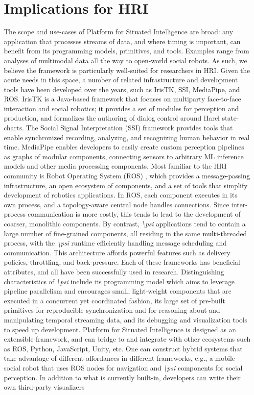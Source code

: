 \documentclass[letterpaper]{article} %
\newcommand{\psif}{\emph{\textbackslash psi} }
\begin{document}
\vspace{-3.02mm}
\section{Implications for HRI}

The scope and use-cases of Platform for Situated Intelligence are broad: any application that processes streams of data, and where timing is important, can benefit from its programming models, primitives, and tools. Examples range from analyses of multimodal data all the way to open-world social robots. As such, we believe the framework is particularly well-suited for researchers in HRI.  Given the acute needs in this space, a number of related infrastructure and development tools have been developed over the years, such as IrisTK, SSI, MediaPipe, and ROS. IrisTK \cite{skantze2012iristk} is a Java-based framework that focuses on multiparty face-to-face interaction and social robotics; it provides a set of modules for perception and production, and formalizes the authoring of dialog control around Harel state-charts. The Social Signal Interpretation (SSI) framework \cite{wagner2013social} provides tools that enable synchronized recording, analyzing, and recognizing human behavior in real time. MediaPipe \cite{lugaresi2019mediapipe} enables developers to easily create custom perception pipelines as graphs of modular components, connecting sensors to arbitrary ML inference models and other media processing components.  Most familiar to the HRI community is Robot Operating System (ROS) \cite{Quigley09}, which provides a message-passing infrastructure, an open ecosystem of components, and a set of tools that simplify development of robotics applications. In ROS, each component executes in its own process, and a topology-aware central node handles connections. Since inter-process communication is more costly, this tends to lead to the development of coarser, monolithic components. By contrast, \psif applications tend to contain a large number of fine-grained components, all residing in the same multi-threaded process, with the \psif runtime efficiently handling message scheduling and communication. This architecture affords powerful features such as delivery policies, throttling, and back-pressure.  Each of these frameworks has beneficial attributes, and all have been successfully used in research. Distinguishing characteristics of \psif include its programming model which aims to leverage pipeline parallelism and encourages small, light-weight components that are executed in a concurrent yet coordinated fashion, its large set of pre-built primitives for reproducible synchronization and for reasoning about and manipulating temporal streaming data, and its debugging and visualization tools to speed up development.  Platform for Situated Intelligence is designed as an extensible framework, and can bridge to and integrate with other ecosystems such as ROS, Python, JavaScript, Unity, etc. One can construct hybrid systems that take advantage of different affordances in different frameworks, e.g., a mobile social robot that uses ROS nodes for navigation and \psif components for social perception. In addition to what is currently built-in, developers can write their own third-party visualizers 
\end{document}
